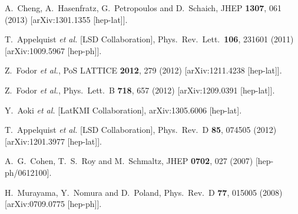\begin{thebibliography}{99}
  A.~Cheng, A.~Hasenfratz, G.~Petropoulos and D.~Schaich,
  JHEP {\bf 1307}, 061 (2013)
  [arXiv:1301.1355 [hep-lat]].

  T.~Appelquist {\it et al.}  [LSD Collaboration],
  Phys.\ Rev.\ Lett.\  {\bf 106}, 231601 (2011)
  [arXiv:1009.5967 [hep-ph]].
  
  Z.~Fodor {\it et al.},
  PoS LATTICE {\bf 2012}, 279 (2012)
  [arXiv:1211.4238 [hep-lat]].
  
  Z.~Fodor {\it et al.},
  Phys.\ Lett.\ B {\bf 718}, 657 (2012)
  [arXiv:1209.0391 [hep-lat]].
  
  Y.~Aoki {\it et al.} [LatKMI Collaboration],
  arXiv:1305.6006 [hep-lat].
  
  T.~Appelquist {\it et al.} [LSD Collaboration],
  Phys.\ Rev.\ D {\bf 85}, 074505 (2012)
  [arXiv:1201.3977 [hep-lat]].
  
  A.~G.~Cohen, T.~S.~Roy and M.~Schmaltz,
  JHEP {\bf 0702}, 027 (2007)
  [hep-ph/0612100].
  
  H.~Murayama, Y.~Nomura and D.~Poland,
  Phys.\ Rev.\ D {\bf 77}, 015005 (2008)
  [arXiv:0709.0775 [hep-ph]].
  

\end{thebibliography}
